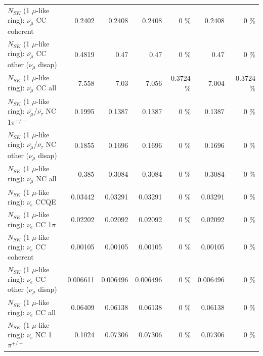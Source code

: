 \begin{table}
\begin{tabular}{| l | r | r | r  r | r  r |}
                       $N_{SK}$ (1 $\mu$-like ring): $\bar{\nu_\mu}$ CC coherent &          0.2402 &          0.2408 &          0.2408 &        0 \%  &          0.2408 &        0 \%  \\ 
        $N_{SK}$ (1 $\mu$-like ring): $\bar{\nu_\mu}$ CC other ($\nu_\mu$ disap) &          0.4819 &            0.47 &            0.47 &        0 \%  &            0.47 &        0 \%  \\ 
                          $N_{SK}$ (1 $\mu$-like ring): $\bar{\nu_{\mu}}$ CC all &           7.558 &            7.03 &           7.056 &   0.3724 \%  &           7.004 &  -0.3724 \%  \\ 
\hline
  $N_{SK}$ (1 $\mu$-like ring): $\bar{\nu_\mu}$/$\bar{\nu_\tau}$ NC 1$\pi^{+/-}$ &          0.1995 &          0.1387 &          0.1387 &        0 \%  &          0.1387 &        0 \%  \\ 
$N_{SK}$ (1 $\mu$-like ring): $\bar{\nu_\mu}$/$\bar{\nu_\tau}$ NC other ($\nu_\mu$ disap) &          0.1855 &          0.1696 &          0.1696 &        0 \%  &          0.1696 &        0 \%  \\ 
                          $N_{SK}$ (1 $\mu$-like ring): $\bar{\nu_{\mu}}$ NC all &           0.385 &          0.3084 &          0.3084 &        0 \%  &          0.3084 &        0 \%  \\ 
\hline
\hline
\hline
                                      $N_{SK}$ (1 $\mu$-like ring): $\nu_e$ CCQE &         0.03442 &         0.03291 &         0.03291 &        0 \%  &         0.03291 &        0 \%  \\ 
                                 $N_{SK}$ (1 $\mu$-like ring): $\nu_e$ CC 1$\pi$ &         0.02202 &         0.02092 &         0.02092 &        0 \%  &         0.02092 &        0 \%  \\ 
                               $N_{SK}$ (1 $\mu$-like ring): $\nu_e$ CC coherent &         0.00105 &         0.00105 &         0.00105 &        0 \%  &         0.00105 &        0 \%  \\ 
                $N_{SK}$ (1 $\mu$-like ring): $\nu_e$ CC other ($\nu_\mu$ disap) &        0.006611 &        0.006496 &        0.006496 &        0 \%  &        0.006496 &        0 \%  \\ 
                                  $N_{SK}$ (1 $\mu$-like ring): $\nu_{e}$ CC all &         0.06409 &         0.06138 &         0.06138 &        0 \%  &         0.06138 &        0 \%  \\ 
\hline
                           $N_{SK}$ (1 $\mu$-like ring): $\nu_e$ NC 1$\pi^{+/-}$ &          0.1024 &         0.07306 &         0.07306 &        0 \%  &         0.07306 &        0 \%  \\ 

\end{tabular}
\end{table}
